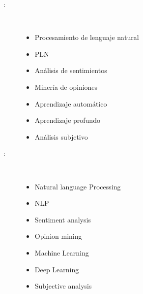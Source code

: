 \begin{multicols}{2}
\begin{description}
\item [\palabraschaveprincipal:] \mbox{} \\[-20pt]
  \begin{itemize}
  	\item Procesamiento de lenguaje natural
  	\item PLN
  	\item Análisis de sentimientos
  	\item Minería de opiniones
  	\item Aprendizaje automático
  	\item Aprendizaje profundo
  	\item Análisis subjetivo
  \end{itemize}
\end{description}
\begin{description}
\item [\palabraschavesecundaria:] \mbox{} \\[-20pt]
  \begin{itemize}
  	\item Natural language Processing
  	\item NLP
  	\item Sentiment analysis
  	\item Opinion mining
  	\item Machine Learning
  	\item Deep Learning
  	\item Subjective analysis
  \end{itemize}
\end{description}
\end{multicols}
